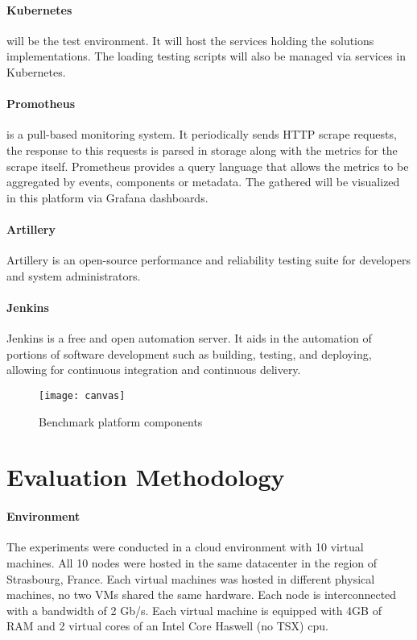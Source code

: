 \paragraph{Kubernetes ~\cite{kubernetes}} will be the test environment.
It will host the services holding the solutions implementations.
The loading testing scripts will also be managed via services in Kubernetes.

\paragraph{Promotheus ~\cite{turnbull2018monitoring}} is a pull-based monitoring system.
It periodically sends HTTP scrape requests, the response to this requests is parsed in storage along with the metrics for the scrape itself.
Prometheus provides a query language that allows the metrics to be aggregated by events, components or metadata.
The gathered will be visualized in this platform via Grafana dashboards.

\paragraph{Artillery}
Artillery is an open-source performance and reliability testing suite for developers and system administrators.

\paragraph{Jenkins}
Jenkins is a free and open automation server.
It aids in the automation of portions of software development such as building, testing, and deploying, allowing for continuous integration and continuous delivery.

\begin{figure}[htbp]
    \centering
    \texttt{[image: canvas]}
    \caption{Benchmark platform components}
    \label{fig:canvas}
\end{figure}

\section{Evaluation Methodology} %
\label{sec:evaluation_methodology}

\paragraph{Environment}

The experiments were conducted in a cloud environment with 10 virtual machines.
All 10 nodes were hosted in the same datacenter in the region of Strasbourg, France.
Each virtual machines was hosted in different physical machines, no two VMs shared the same hardware.
Each node is interconnected with a bandwidth of 2 Gb/s.
Each virtual machine is equipped with 4GB of RAM and 2 virtual cores of an Intel Core Haswell (no TSX) cpu.

